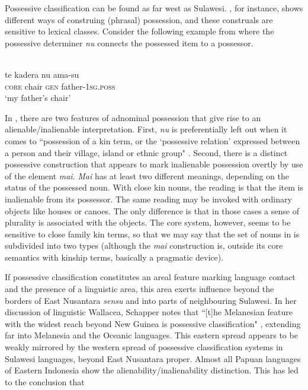 Possessive classification can be found as far west as Sulawesi. , for instance, shows different ways of construing (phrasal) possession, and these construals are sensitive to lexical classes. Consider the following example from  where the possessive determiner \textit{nu} connects the possessed item to a possessor.

\ea 
{}\\
\gll te kadera nu ama-su\\
\textsc{core} chair \textsc{gen} father-\textsc{1}\textsc{sg}.\textsc{poss}\\
\glt ‘my father's chair’
\z

In , there are two features of adnominal possession that give rise to an alienable/inalienable interpretation. First, \textit{nu} is preferentially left out when it comes to ``possession of a kin term, or the `possessive relation' expressed between a person and their village, island or ethnic group" \citep[346]{donohue1999}. Second, there is a distinct possessive construction that appears to mark inalienable possession overtly by use of the element \textit{mai}. \textit{Mai} has at least two different meanings, depending on the status of the possessed noun. With close kin nouns, the reading is that the item is inalienable from its possessor. The same reading may be invoked with ordinary objects like houses or canoes. The only difference is that in those cases a sense of plurality is associated with the objects. The core system, however, seems to be sensitive to close family kin terms, so that we may say that the set of nouns in  is subdivided into two types (although the \textit{mai} construction is, outside its core semantics with kinship terms, basically a pragmatic device). 

If possessive classification constitutes an areal feature marking language contact and the presence of a linguistic area, this area exerts influence beyond the borders of East Nusantara \textit{sensu} \citet{klamer2008east} and into parts of neighbouring Sulawesi. In her discussion of linguistic Wallacea, Schapper notes that ``[t]he Melanesian feature with the widest reach beyond New Guinea is possessive classification" \citep[108]{schapper2015wallacea}, extending far into Melanesia and the Oceanic languages. This eastern spread appears to be weakly mirrored by the western spread of possessive classification systems in Sulawesi languages, beyond East Nusantara proper. Almost all Papuan languages of Eastern Indonesia show the alienability/inalienability distinction. This has led \citet[120]{klamer2008east} to the conclusion that

